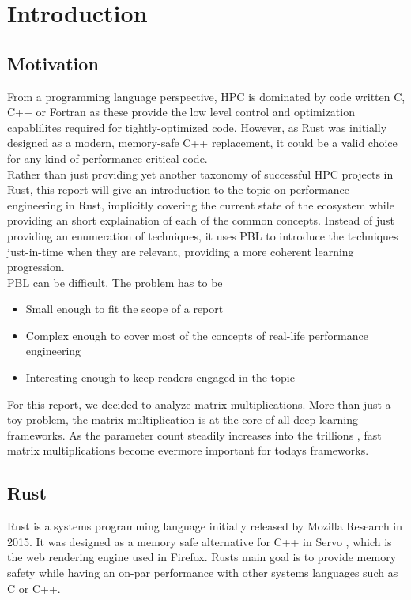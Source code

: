 \section{Introduction}
\subsection{Motivation}
From a programming language perspective, \ac{HPC} is dominated by code written C, C++ or Fortran as these provide the low level control and optimization capablilites required for tightly-optimized code. However, as Rust was initially designed as a modern, memory-safe C++ replacement, it could be a valid choice for any kind of performance-critical code.\\

Rather than just providing yet another taxonomy of successful \ac{HPC} projects in Rust, this report will give an introduction to the topic on performance engineering in Rust, implicitly covering the current state of the ecosystem while providing an short explaination of each of the common concepts. Instead of just providing an enumeration of techniques, it uses \ac{PBL} to introduce the techniques just-in-time when they are relevant, providing a more coherent learning progression.\\

\acl{PBL} can be difficult. The problem has to be
\begin{itemize}
  \item Small enough to fit the scope of a report
  \item Complex enough to cover most of the concepts of real-life performance engineering
  \item Interesting enough to keep readers engaged in the topic
\end{itemize}

For this report, we decided to analyze matrix multiplications. More than just a toy-problem, the matrix multiplication is at the core of all deep learning frameworks. As the parameter count steadily increases into the trillions \cite{gpt4}, fast matrix multiplications become evermore important for todays frameworks.

\subsection{Rust}
Rust \cite{rust} is a systems programming language initially released by Mozilla Research in 2015. It was designed as a memory safe alternative for C++ in Servo \cite{servo}, which is the web rendering engine used in Firefox. Rusts main goal is to provide memory safety while having an on-par performance with other systems languages such as C or C++.\\

